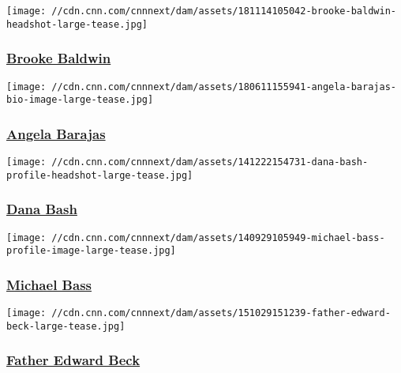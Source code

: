\href{/profiles/brooke-baldwin-profile}{}

\texttt{[image: //cdn.cnn.com/cnnnext/dam/assets/181114105042-brooke-baldwin-headshot-large-tease.jpg]}

\hypertarget{brooke-baldwin}{%
\subsubsection{\texorpdfstring{\href{/profiles/brooke-baldwin-profile}{Brooke
Baldwin}}{Brooke Baldwin}}\label{brooke-baldwin}}

\href{/profiles/angela-barajas-profile}{}

\texttt{[image: //cdn.cnn.com/cnnnext/dam/assets/180611155941-angela-barajas-bio-image-large-tease.jpg]}

\hypertarget{angela-barajas-}{%
\subsubsection{\texorpdfstring{\href{/profiles/angela-barajas-profile}{Angela
Barajas }}{Angela Barajas }}\label{angela-barajas-}}

\href{/profiles/dana-bash-profile}{}

\texttt{[image: //cdn.cnn.com/cnnnext/dam/assets/141222154731-dana-bash-profile-headshot-large-tease.jpg]}

\hypertarget{dana-bash}{%
\subsubsection{\texorpdfstring{\href{/profiles/dana-bash-profile}{Dana
Bash}}{Dana Bash}}\label{dana-bash}}

\href{/profiles/michael-bass-profile}{}

\texttt{[image: //cdn.cnn.com/cnnnext/dam/assets/140929105949-michael-bass-profile-image-large-tease.jpg]}

\hypertarget{michael-bass}{%
\subsubsection{\texorpdfstring{\href{/profiles/michael-bass-profile}{Michael
Bass}}{Michael Bass}}\label{michael-bass}}

\href{/profiles/father-edward-beck-profile}{}

\texttt{[image: //cdn.cnn.com/cnnnext/dam/assets/151029151239-father-edward-beck-large-tease.jpg]}

\hypertarget{father-edward-beck-}{%
\subsubsection{\texorpdfstring{\href{/profiles/father-edward-beck-profile}{Father
Edward Beck }}{Father Edward Beck }}\label{father-edward-beck-}}

